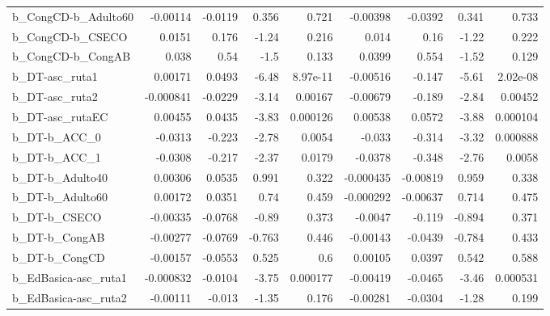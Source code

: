 \begin{tabular}{lrrrrrrrr}
b\_CongCD-b\_Adulto60        &    -0.00114 &      -0.0119 &    0.356 &    0.721 &   -0.00398 &     -0.0392 &        0.341 &         0.733 \\
b\_CongCD-b\_CSECO           &      0.0151 &        0.176 &    -1.24 &    0.216 &      0.014 &        0.16 &        -1.22 &         0.222 \\
b\_CongCD-b\_CongAB          &       0.038 &         0.54 &     -1.5 &    0.133 &     0.0399 &       0.554 &        -1.52 &         0.129 \\
b\_DT-asc\_ruta1             &     0.00171 &       0.0493 &    -6.48 & 8.97e-11 &   -0.00516 &      -0.147 &        -5.61 &      2.02e-08 \\
b\_DT-asc\_ruta2             &   -0.000841 &      -0.0229 &    -3.14 &  0.00167 &   -0.00679 &      -0.189 &        -2.84 &       0.00452 \\
b\_DT-asc\_rutaEC            &     0.00455 &       0.0435 &    -3.83 & 0.000126 &    0.00538 &      0.0572 &        -3.88 &      0.000104 \\
b\_DT-b\_ACC\_0               &     -0.0313 &       -0.223 &    -2.78 &   0.0054 &     -0.033 &      -0.314 &        -3.32 &      0.000888 \\
b\_DT-b\_ACC\_1               &     -0.0308 &       -0.217 &    -2.37 &   0.0179 &    -0.0378 &      -0.348 &        -2.76 &        0.0058 \\
b\_DT-b\_Adulto40            &     0.00306 &       0.0535 &    0.991 &    0.322 &  -0.000435 &    -0.00819 &        0.959 &         0.338 \\
b\_DT-b\_Adulto60            &     0.00172 &       0.0351 &     0.74 &    0.459 &  -0.000292 &    -0.00637 &        0.714 &         0.475 \\
b\_DT-b\_CSECO               &    -0.00335 &      -0.0768 &    -0.89 &    0.373 &    -0.0047 &      -0.119 &       -0.894 &         0.371 \\
b\_DT-b\_CongAB              &    -0.00277 &      -0.0769 &   -0.763 &    0.446 &   -0.00143 &     -0.0439 &       -0.784 &         0.433 \\
b\_DT-b\_CongCD              &    -0.00157 &      -0.0553 &    0.525 &      0.6 &    0.00105 &      0.0397 &        0.542 &         0.588 \\
b\_EdBasica-asc\_ruta1       &   -0.000832 &      -0.0104 &    -3.75 & 0.000177 &   -0.00419 &     -0.0465 &        -3.46 &      0.000531 \\
b\_EdBasica-asc\_ruta2       &    -0.00111 &       -0.013 &    -1.35 &    0.176 &   -0.00281 &     -0.0304 &        -1.28 &         0.199 \\

\end{tabular}
